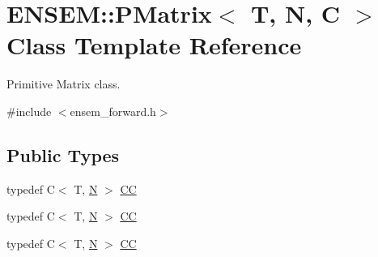\hypertarget{classENSEM_1_1PMatrix}{}\section{E\+N\+S\+EM\+:\+:P\+Matrix$<$ T, N, C $>$ Class Template Reference}
\label{classENSEM_1_1PMatrix}


Primitive Matrix class.  




{\ttfamily \#include $<$ensem\+\_\+forward.\+h$>$}

\subsection*{Public Types}
\begin{DoxyCompactItemize}
\item 
typedef C$<$ T, \mbox{\hyperlink{adat__devel_2lib_2hadron_2operator__name__util_8cc_a7722c8ecbb62d99aee7ce68b1752f337}{N}} $>$ \mbox{\hyperlink{classENSEM_1_1PMatrix_a744bac549029029effe32dc1705660ec}{CC}}
\item 
typedef C$<$ T, \mbox{\hyperlink{adat__devel_2lib_2hadron_2operator__name__util_8cc_a7722c8ecbb62d99aee7ce68b1752f337}{N}} $>$ \mbox{\hyperlink{classENSEM_1_1PMatrix_a744bac549029029effe32dc1705660ec}{CC}}
\item 
typedef C$<$ T, \mbox{\hyperlink{adat__devel_2lib_2hadron_2operator__name__util_8cc_a7722c8ecbb62d99aee7ce68b1752f337}{N}} $>$ \mbox{\hyperlink{classENSEM_1_1PMatrix_a744bac549029029effe32dc1705660ec}{CC}}
\end{DoxyCompactItemize}
